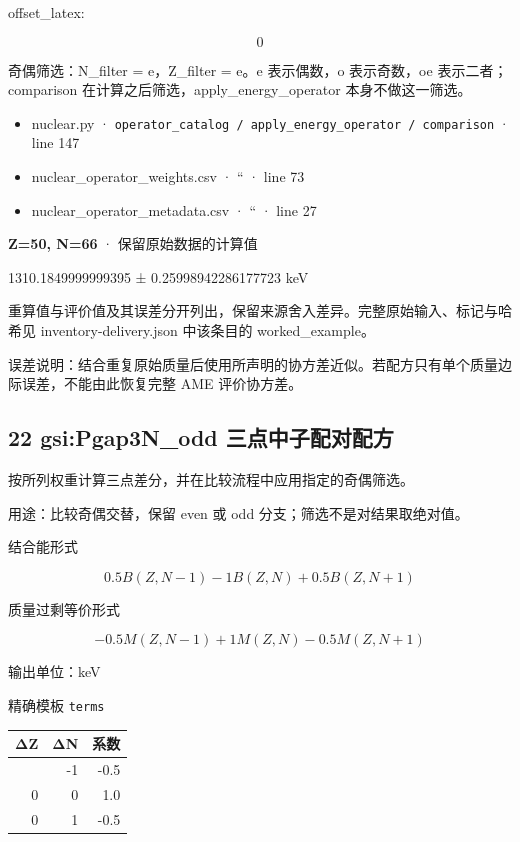 \documentclass[
  11pt,
  letterpaper,
]{article}
\providecommand{\tightlist}{%
  \setlength{\itemsep}{0pt}\setlength{\parskip}{0pt}}
\begin{document}
offset\_latex:

\[
0
\]

奇偶筛选：N\_filter = e，Z\_filter = e。e 表示偶数，o 表示奇数，oe
表示二者；comparison 在计算之后筛选，apply\_energy\_operator
本身不做这一筛选。

\begin{itemize}
\tightlist
\item
  nuclear.py ·
  \texttt{operator\_catalog\ /\ apply\_energy\_operator\ /\ comparison}
  · line 147
\item
  nuclear\_operator\_weights.csv · `` · line 73
\item
  nuclear\_operator\_metadata.csv · `` · line 27
\end{itemize}

\textbf{Z=50, N=66} · 保留原始数据的计算值

1310.1849999999395 ± 0.25998942286177723 keV

重算值与评价值及其误差分开列出，保留来源舍入差异。完整原始输入、标记与哈希见
inventory-delivery.json 中该条目的 worked\_example。

误差说明：结合重复原始质量后使用所声明的协方差近似。若配方只有单个质量边际误差，不能由此恢复完整
AME 评价协方差。

\subsection{22 gsi:Pgap3N\_odd
三点中子配对配方}\label{gsipgap3n_odd-ux4e09ux70b9ux4e2dux5b50ux914dux5bf9ux914dux65b9}

按所列权重计算三点差分，并在比较流程中应用指定的奇偶筛选。

用途：比较奇偶交替，保留 even 或 odd 分支；筛选不是对结果取绝对值。

结合能形式

\[
0.5B(Z,N-1)-1B(Z,N)+0.5B(Z,N+1)
\]

质量过剩等价形式

\[
-0.5M(Z,N-1)+1M(Z,N)-0.5M(Z,N+1)
\]

输出单位：keV

精确模板 \texttt{terms}

\begin{longtable}[]{@{}rrr@{}}
\toprule\noalign{}
ΔZ & ΔN & 系数 \\
\midrule\noalign{}
\endhead
\bottomrule\noalign{}
\endlastfoot
0 & -1 & -0.5 \\
0 & 0 & 1.0 \\
0 & 1 & -0.5 \\
\end{longtable}
\end{document}
